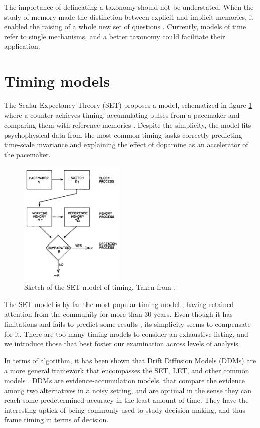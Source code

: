         The importance of delineating a taxonomy should not be understated. When the study of memory made the distinction between explicit and implicit memories, it enabled the raising of a whole new set of questions \cite{paton2018neural}. Currently, models of time refer to single mechanisms, and a better taxonomy could facilitate their application.

\section{Timing models}
\label{sec:models}
    The Scalar Expectancy Theory (SET) proposes a model, schematized in figure \ref{fig:set_schema} where a counter achieves timing, accumulating pulses from a pacemaker and comparing them with reference memories \cite{gibbon1977scalar}. Despite the simplicity, the model fits psychophysical data from the most common timing tasks \cite{machado2009learning} correctly predicting time-scale invariance and explaining the effect of dopamine as an accelerator of the pacemaker.
    
    \begin{figure}
        \centering
        \includegraphics[width=5cm]{figures/SET_model_schema.png}
        \caption[The SET model of timing.]{Sketch of the SET model of timing. Taken from \cite{gibbon1977scalar}.}
        \label{fig:set_schema}
    \end{figure}
    
    The SET model is by far the most popular timing model \cite{buhusi2005makes}, having retained attention from the community for more than 30 years. Even though it has limitations and fails to predict some results \cite{machado2009learning}, its simplicity seems to compensate for it. There are too many timing models to consider an exhaustive listing, and we introduce those that best foster our examination across levels of analysis. 
    
    In terms of algorithm, it has been shown that Drift Diffusion Models (DDMs) are a more general framework that encompasses the SET, LET, and other common models \cite{balci2016decision}. DDMs are evidence-accumulation models, that compare the evidence among two alternatives in a noisy setting, and are optimal in the sense they can reach some predetermined accuracy in the least amount of time. They have the interesting uptick of being commonly used to study decision making, and thus frame timing in terms of decision. 
    
